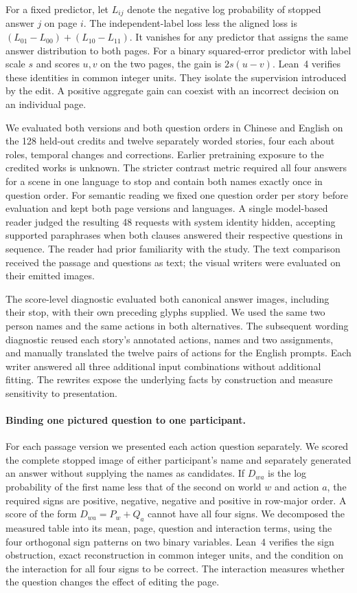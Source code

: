 \documentclass[12pt,a4paper]{article}
\providecommand{\DIFadd}[1]{{\protect\color{blue} \sf #1}} %
\begin{document}
\DIFadd{For a fixed predictor, let $L_{ij}$ denote the negative log probability of stopped answer $j$ on page $i$. The independent-label loss less the aligned loss is $(L_{01}-L_{00})+(L_{10}-L_{11})$. It vanishes for any predictor that assigns the same answer distribution to both pages. For a binary squared-error predictor with label scale $s$ and scores $u,v$ on the two pages, the gain is $2s(u-v)$. Lean~4 verifies these identities in common integer units. They isolate the supervision introduced by the edit. A positive aggregate gain can coexist with an incorrect decision on an individual page.
}

\DIFadd{We evaluated both versions and both question orders in Chinese and English on the 128 held-out credits and twelve separately worded stories, four each about roles, temporal changes and corrections. Earlier pretraining exposure to the credited works is unknown. The stricter contrast metric required all four answers for a scene in one language to stop and contain both names exactly once in question order. For semantic reading we fixed one question order per story before evaluation and kept both page versions and languages. A single model-based reader judged the resulting 48 requests with system identity hidden, accepting supported paraphrases when both clauses answered their respective questions in sequence. The reader had prior familiarity with the study. The text comparison received the passage and questions as text; the visual writers were evaluated on their emitted images.
}

\DIFadd{The score-level diagnostic evaluated both canonical answer images, including their stop, with their own preceding glyphs supplied. We used the same two person names and the same actions in both alternatives. The subsequent wording diagnostic reused each story's annotated actions, names and two assignments, and manually translated the twelve pairs of actions for the English prompts. Each writer answered all three additional input combinations without additional fitting. The rewrites expose the underlying facts by construction and measure sensitivity to presentation.
}

\paragraph{\DIFadd{Binding one pictured question to one participant.}}
\DIFadd{For each passage version we presented each action question separately. We scored the complete stopped image of either participant's name and separately generated an answer without supplying the names as candidates. If $D_{wa}$ is the log probability of the first name less that of the second on world $w$ and action $a$, the required signs are positive, negative, negative and positive in row-major order. A score of the form $D_{wa}=P_w+Q_a$ cannot have all four signs. We decomposed the measured table into its mean, page, question and interaction terms, using the four orthogonal sign patterns on two binary variables. Lean~4 verifies the sign obstruction, exact reconstruction in common integer units, and the condition on the interaction for all four signs to be correct. The interaction measures whether the question changes the effect of editing the page.
}
\end{document}
